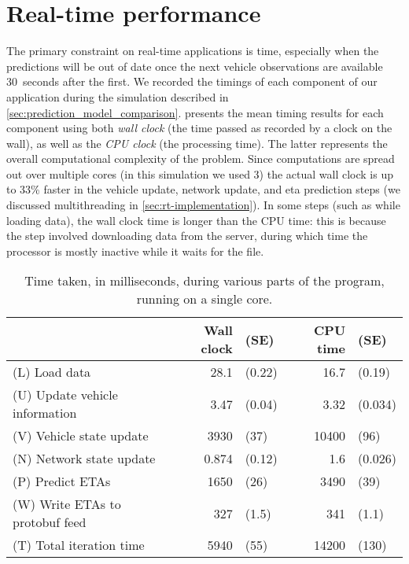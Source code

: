 \section{Real-time performance}
\label{sec:prediction_performance}

The primary constraint on real-time applications is time, especially when the predictions will be out of date once the next vehicle observations are available 30~seconds after the first. We recorded the timings of each component of our application during the simulation described in \cref{sec:prediction_model_comparison}.  presents the mean timing results for each component using both \emph{wall clock} (the time passed as recorded by a clock on the wall), as well as the \emph{CPU clock} (the processing time). The latter represents the overall computational complexity of the problem. Since computations are spread out over multiple cores (in this simulation we used 3)  the actual wall clock is up to 33\% faster in the vehicle update, network update, and \gls{eta} prediction steps (we discussed multithreading in \cref{sec:rt-implementation}). In some steps (such as while loading data), the wall clock time is longer than the CPU time: this is because the step involved downloading data from the server, during which time the processor is mostly inactive while it waits for the file.



\begin{knitrout}\small
{}\color{fgcolor}\begin{table}

\caption{\label{tab:prediction_timing}Time taken, in milliseconds, during various parts of the program, running on a single core.}
\centering
\fontsize{8}{10}\selectfont
\begin{tabular}[t]{lrlrl}
\toprule
 & Wall clock & (SE) & CPU time & (SE)\\
\midrule
(L) Load data & 28.1 & (0.22) & 16.7 & (0.19)\\
(U) Update vehicle information & 3.47 & (0.04) & 3.32 & (0.034)\\
(V) Vehicle state update & 3930 & (37) & 10400 & (96)\\
(N) Network state update & 0.874 & (0.12) & 1.6 & (0.026)\\
(P) Predict ETAs & 1650 & (26) & 3490 & (39)\\
\addlinespace
(W) Write ETAs to protobuf feed & 327 & (1.5) & 341 & (1.1)\\
\midrule
(T) Total iteration time & 5940 & (55) & 14200 & (130)\\
\bottomrule
\end{tabular}
\end{table}


\end{knitrout}


